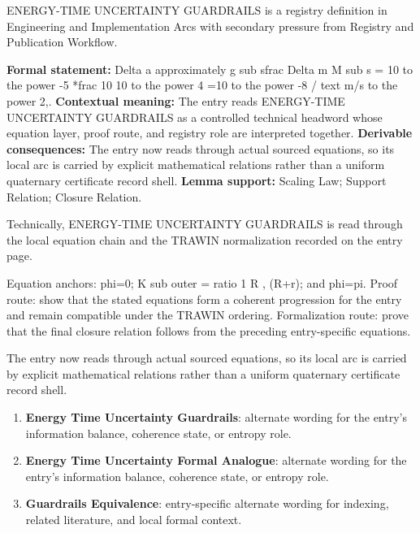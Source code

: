
\begingroup\small
{}
ENERGY-TIME UNCERTAINTY GUARDRAILS is a registry definition in Engineering and Implementation Arcs with secondary pressure from Registry and Publication Workflow.

\begingroup\footnotesize\setlength{\emergencystretch}{3em}\sloppy
\textbf{Formal statement:} Delta a approximately g sub sfrac Delta m M sub s = 10 to the power -5 *frac 10 10 to the power 4 =10 to the power -8 / text m/s to the power 2,. \textbf{Contextual meaning:} The entry reads ENERGY-TIME UNCERTAINTY GUARDRAILS as a controlled technical headword whose equation layer, proof route, and registry role are interpreted together. \textbf{Derivable consequences:} The entry now reads through actual sourced equations, so its local arc is carried by explicit mathematical relations rather than a uniform quaternary certificate record shell. \textbf{Lemma support:} Scaling Law; Support Relation; Closure Relation.\par
\endgroup

Technically, ENERGY-TIME UNCERTAINTY GUARDRAILS is read through the local equation chain and the TRAWIN normalization recorded on the entry page.

Equation anchors: phi=0; K sub outer = ratio 1 R , (R+r); and phi=pi. Proof route: show that the stated equations form a coherent progression for the entry and remain compatible under the TRAWIN ordering. Formalization route: prove that the final closure relation follows from the preceding entry-specific equations.

The entry now reads through actual sourced equations, so its local arc is carried by explicit mathematical relations rather than a uniform quaternary certificate record shell.
\endgroup

\begin{enumerate}[leftmargin=1.6em,itemsep=6pt,topsep=4pt]
\item \textbf{Energy Time Uncertainty Guardrails}: alternate wording for the entry's information balance, coherence state, or entropy role.
\item \textbf{Energy Time Uncertainty Formal Analogue}: alternate wording for the entry's information balance, coherence state, or entropy role.
\item \textbf{Guardrails Equivalence}: entry-specific alternate wording for indexing, related literature, and local formal context.
\end{enumerate}

